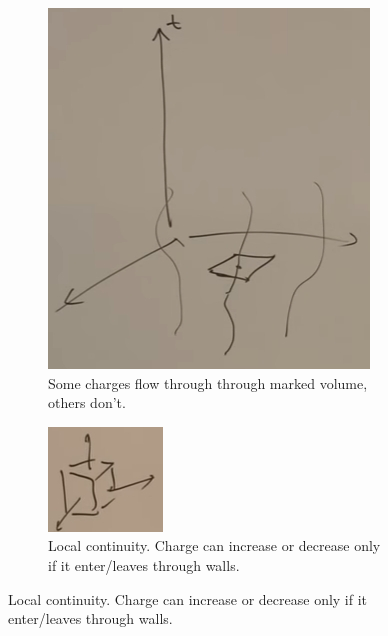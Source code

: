\documentclass[]{article}
\begin{document}
{\begin{figure}[H]
	\caption{Charge}
	\begin{subfigure}[t]{0.45\textwidth}
		\caption{Some charges flow through through marked volume, others don't.}\label{fig:qr-9-charge-density}
		\includegraphics[width=\textwidth]{qr-9-charge-density}
	\end{subfigure}
	\begin{subfigure}[t]{0.45\textwidth}
		\caption{Local continuity. Charge can increase or decrease only if it enter/leaves through walls.}\label{fig:gr-9-continuity}
		\includegraphics[width=\textwidth]{gr-9-continuity}
	\end{subfigure}
\end{figure}

}
\end{document}
